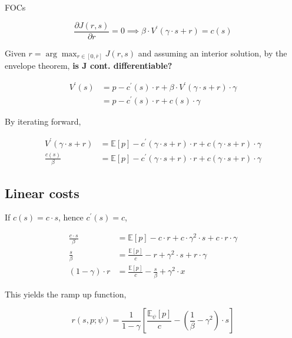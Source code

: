 \documentclass[american]{scrartcl}
\newcommand{\E}{\mathbb{E}}
\begin{document}
FOCs

\begin{equation}
	\frac{\partial J(r, s)}{\partial r} = 0 \implies \beta \cdot V^\prime (\gamma \cdot s + r) = c(s)
\end{equation}

Given $r = \arg\max_{r \in [0, \bar{r}]} J(r, s)$ and assuming an interior solution, by the envelope theorem, \textbf{is J cont. differentiable?}

\begin{equation}
	\begin{split}
		V^\prime (s) &= p - c^\prime(s) \cdot r + \beta \cdot V^\prime(\gamma \cdot s + r) \cdot \gamma \\
		&= p - c^\prime(s) \cdot r + c(s) \cdot \gamma
	\end{split}
\end{equation}

By iterating forward,

\begin{equation}
	\begin{split}
		V^\prime (\gamma \cdot s + r) &= \E[p] - c^\prime(\gamma \cdot s + r) \cdot r + c(\gamma \cdot s + r) \cdot \gamma \\
		\frac{c(s)}{\beta} &= \E[p] - c^\prime(\gamma \cdot s + r) \cdot r + c(\gamma \cdot s + r) \cdot \gamma
	\end{split}
\end{equation}

\subsection{Linear costs}

If $c(s) = c \cdot s$, hence $c^\prime(s) = c$,

\begin{equation}
	\begin{split}
		\frac{c \cdot s}{\beta} &= \E[p] - c \cdot r + c \cdot \gamma^2 \cdot s + c \cdot r \cdot \gamma \\
		\frac{s}{\beta} &= \frac{\E[p]}{c} - r + \gamma^2 \cdot s + r \cdot \gamma \\
		(1 - \gamma) \cdot r &= \frac{\E[p]}{c} - \frac{s}{\beta} + \gamma^2 \cdot x
	\end{split}
\end{equation}

This yields the ramp up function,

\begin{equation}
	r(s, p; \psi) = \frac{1}{1-\gamma} \left[ \frac{\E_\psi[p]}{c} - \left( \frac{1}{\beta} - \gamma^2 \right) \cdot s \right]
\end{equation}
\end{document}
